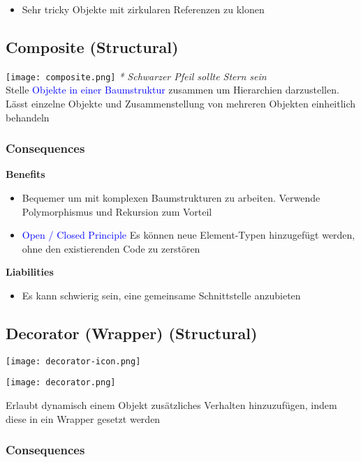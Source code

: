 \begin{itemize}
    \item Sehr tricky Objekte mit zirkularen Referenzen zu klonen
\end{itemize}

\subsection{Composite (Structural)}

\texttt{[image: composite.png]}
\textit{* Schwarzer Pfeil sollte Stern sein} \\

Stelle \textcolor{blue}{Objekte in einer Baumstruktur} zusammen um Hierarchien darzustellen. Lässt einzelne Objekte und Zusammenstellung von mehreren Objekten einheitlich behandeln

\subsubsection{Consequences}

\textbf{Benefits}
\begin{itemize}
    \item Bequemer um mit komplexen Baumstrukturen zu arbeiten. Verwende Polymorphismus und Rekursion zum Vorteil
    \item \textcolor{blue}{Open / Closed Principle} Es können neue Element-Typen hinzugefügt werden, ohne den existierenden Code zu zerstören
\end{itemize}
\vspace{10pt}
\textbf{Liabilities}

\begin{itemize}
    \item Es kann schwierig sein, eine gemeinsame Schnittstelle anzubieten
\end{itemize}

\subsection{Decorator (Wrapper) (Structural)}

\texttt{[image: decorator-icon.png]}

\texttt{[image: decorator.png]}

Erlaubt dynamisch einem Objekt zusätzliches Verhalten hinzuzufügen, indem diese in ein Wrapper gesetzt
werden

\subsubsection{Consequences}

